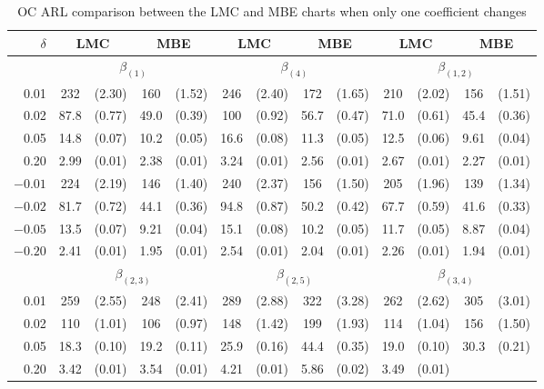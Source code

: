\begin{table}[htp]
\tabcolsep 4.5pt \vspace{-0.1cm} \centering \caption{OC ARL comparison between the
LMC and MBE charts when only one coefficient changes} \vspace{0.3cm}
\renewcommand{\arraystretch}{1.32}
\begin{tabular}{r|cccc|cccc|cccc}\hline
$\delta$ & \multicolumn{2}{c}{LMC} & \multicolumn{2}{c|}{MBE} &
\multicolumn{2}{c}{LMC} & \multicolumn{2}{c|}{MBE} & \multicolumn{2}{c}{LMC} &
\multicolumn{2}{c}{MBE}
\\\hline
& \multicolumn{4}{c|}{$\beta_{(1)}$} & \multicolumn{4}{c|}{$\beta_{(4)}$} &
\multicolumn{4}{c}{$\beta_{(1,2)}$}
\\\hline
0.01 & 232 & (2.30) & 160 & (1.52) & 246 & (2.40) & 172 & (1.65) & 210 & (2.02) &
156 & (1.51)
\\
0.02 & 87.8 & (0.77) & 49.0 & (0.39) & 100 & (0.92) & 56.7 & (0.47) & 71.0 & (0.61)
& 45.4 & (0.36)
\\
0.05 & 14.8 & (0.07) & 10.2 & (0.05) & 16.6 & (0.08) & 11.3 & (0.05) & 12.5 & (0.06)
& 9.61 & (0.04)
\\
0.20 & 2.99 & (0.01) & 2.38 & (0.01) & 3.24 & (0.01) & 2.56 & (0.01) & 2.67 & (0.01)
& 2.27 & (0.01)
\\
$-0.01$ & 224 & (2.19) & 146 & (1.40) & 240 & (2.37) & 156& (1.50) & 205 & (1.96) &
139 & (1.34)
\\
$-0.02$ & 81.7 & (0.72) & 44.1 & (0.36) & 94.8 & (0.87) & 50.2 & (0.42) & 67.7 &
(0.59) & 41.6 & (0.33)
\\
$-0.05$ & 13.5 & (0.07) & 9.21 & (0.04) & 15.1 & (0.08) & 10.2 & (0.05) & 11.7 &
(0.05) & 8.87 & (0.04)
\\
$-0.20$ & 2.41 & (0.01) & 1.95 & (0.01) & 2.54 & (0.01) & 2.04 & (0.01) & 2.26 &
(0.01) & 1.94 & (0.01)
\\\hline
& \multicolumn{4}{c|}{$\beta_{(2,3)}$} & \multicolumn{4}{c|}{$\beta_{(2,5)}$} &
\multicolumn{4}{c}{$\beta_{(3,4)}$}
\\\hline
0.01 & 259 & (2.55) & 248 & (2.41) & 289 & (2.88) & 322 & (3.28) & 262 & (2.62) &
305 & (3.01)
\\
0.02 & 110 & (1.01) & 106 & (0.97) & 148 & (1.42) & 199 & (1.93) & 114 & (1.04) &
156 & (1.50)
\\
0.05 & 18.3 & (0.10) & 19.2 & (0.11) & 25.9 & (0.16) & 44.4 & (0.35) & 19.0 & (0.10)
& 30.3 & (0.21)
\\
0.20 & 3.42 & (0.01) & 3.54 & (0.01) & 4.21 & (0.01) & 5.86 & (0.02) & 3.49 & (0.01)

\end{tabular}
\end{table}
